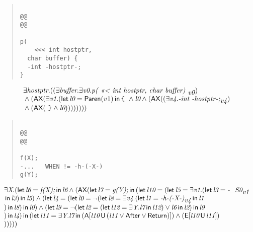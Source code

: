 \documentclass{article}
\newcommand{\U}{\,\mbox{\sf{U}}\,}
\newcommand{\A}{\mbox{\sf{A}}}
\newcommand{\E}{\mbox{\sf{E}}}
\newcommand{\AX}{\mbox{\sf{AX}}}
\newcommand{\mita}[1]{\mbox{\it{{#1}}}}
\newcommand{\msf}[1]{\mbox{\sf{{#1}}}}
\newcommand{\ttlb}{\mbox{\tt \char'173}}
\newcommand{\ttrb}{\mbox{\tt \char'175}}
\begin{document}
\begin{quote}\begin{verbatim}

@@
@@

p(
    <<< int hostptr, 
  char buffer) {
  -int -hostptr-;
}
\end{verbatim}\end{quote}

\[\begin{array}{l}
\exists \mita{hostptr} . ((\exists \mita{buffer} . \exists \mita{v0} . \mita{p(
    <<< int hostptr, 
  char buffer) }_{\mita{v0}})\\\mbox{} \wedge (\AX(\exists \mita{v1} . (\mita{\sf{let}} \, \mita{l0} = \msf{Paren}(v1) \, \mita{\sf{in}} \, \mita{{\ttlb}
  } \wedge \mita{l0} \wedge (\AX((\exists \mita{v4} . \mita{-int -hostptr-;}_{\mita{v4}})\\\mbox{} \wedge (\AX(\mita{
{\ttrb}} \wedge \mita{l0}))))
))))
\end{array}\]

\begin{quote}\begin{verbatim}

@@
@@

f(X);
-...   WHEN != -h-(-X-)
g(Y);
\end{verbatim}\end{quote}

\[\begin{array}{l}
\exists \mita{X} . (\mita{\sf{let}} \, \mita{l6} = \mita{f(X);} \, \mita{\sf{in}} \, \mita{l6} \wedge (\AX(\mita{\sf{let}} \, \mita{l7} = \mita{g(Y);} \, \mita{\sf{in}} \, (\mita{\sf{let}} \, \mita{l10} = (\mita{\sf{let}} \, \mita{l5} = \exists \mita{v1} . (\mita{\sf{let}} \, \mita{l3} = \mita{-\_S0}_{\mita{v1}}\\\mbox{} \, \mita{\sf{in}} \, \mita{l3}
) \, \mita{\sf{in}} \, \mita{l5}
) \wedge (\mita{\sf{let}} \, \mita{l4} = (\mita{\sf{let}} \, \mita{l0} = \neg (\mita{\sf{let}} \, \mita{l8} = \exists \mita{v4} . (\mita{\sf{let}} \, \mita{l1} = \mita{-h-(-X-)}_{\mita{v4}} \, \mita{\sf{in}} \, \mita{l1}\\\mbox{}
) \, \mita{\sf{in}} \, \mita{l8}
) \, \mita{\sf{in}} \, \mita{l0}
) \wedge (\mita{\sf{let}} \, \mita{l9} = \neg (\mita{\sf{let}} \, \mita{l2} = (\mita{\sf{let}} \, \mita{l12} = \exists \mita{Y} . \mita{l7} \, \mita{\sf{in}} \, \mita{l12}
) \vee \mita{l6} \, \mita{\sf{in}} \, \mita{l2}
) \, \mita{\sf{in}} \, \mita{l9}\\\mbox{}
) \, \mita{\sf{in}} \, \mita{l4}
) \, \mita{\sf{in}} \, (\mita{\sf{let}} \, \mita{l11} = \exists \mita{Y} . \mita{l7} \, \mita{\sf{in}} \, (\A[\mita{l10} \U (\mita{l11} \vee \msf{After} \vee \msf{Return})]
) \wedge (\E[\mita{l10} \U \mita{l11}]
)\\\mbox{}
)
)
))
)
\end{array}\]
\end{document}
